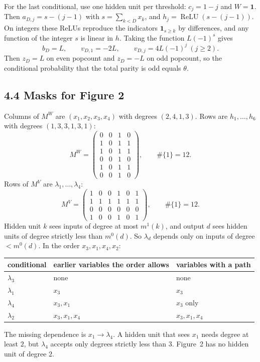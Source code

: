 \documentclass[11pt]{article}
\theoremstyle{remark}
\DeclareMathOperator{\ReLU}{ReLU}
\begin{document}
For the last conditional, use one hidden unit per threshold: \(c_j=1-j\) and \(W=\mathbf{1}\). Then \(a_{D,j}=s-(j-1)\) with \(s=\sum_{k<D}x_k\), and \(h_j=\ReLU(s-(j-1))\). On integers these ReLUs reproduce the indicators \(\mathbf{1}_{s\ge k}\) by differences, and any function of the integer \(s\) is linear in \(h\). Taking the function \(L(-1)^s\) gives
\[
b_D=L,\qquad v_{D,1}=-2L,\qquad v_{D,j}=4L(-1)^j\ (j\ge 2).
\]
Then \(z_D=L\) on even popcount and \(z_D=-L\) on odd popcount, so the conditional probability that the total parity is odd equals \(\theta\).

\subsection*{4.4 Masks for Figure 2}

Columns of \(M^W\) are \((x_1,x_2,x_3,x_4)\) with degrees \((2,4,1,3)\). Rows are \(h_1,\ldots,h_6\) with degrees \((1,3,3,1,3,1)\):
\[
M^W=\begin{pmatrix}
0&0&1&0\\
1&0&1&1\\
1&0&1&1\\
0&0&1&0\\
1&0&1&1\\
0&0&1&0
\end{pmatrix},
\qquad
\#\{1\}=12.
\]
Rows of \(M^V\) are \(\lambda_1,\ldots,\lambda_4\):
\[
M^V=\begin{pmatrix}
1&0&0&1&0&1\\
1&1&1&1&1&1\\
0&0&0&0&0&0\\
1&0&0&1&0&1
\end{pmatrix},
\qquad
\#\{1\}=12.
\]
Hidden unit \(k\) sees inputs of degree at most \(m^1(k)\), and output \(d\) sees hidden units of degree strictly less than \(m^0(d)\). So \(\lambda_d\) depends only on inputs of degree \(<m^0(d)\). In the order \(x_3,x_1,x_4,x_2\):
\begin{center}
\begin{tabular}{@{}lll@{}}
\toprule
conditional & earlier variables the order allows & variables with a path \\
\midrule
\(\lambda_3\) & none & none \\
\(\lambda_1\) & \(x_3\) & \(x_3\) \\
\(\lambda_4\) & \(x_3,x_1\) & \(x_3\) only \\
\(\lambda_2\) & \(x_3,x_1,x_4\) & \(x_3,x_1,x_4\) \\
\bottomrule
\end{tabular}
\end{center}
The missing dependence is \(x_1\to\lambda_4\). A hidden unit that sees \(x_1\) needs degree at least \(2\), but \(\lambda_4\) accepts only degrees strictly less than \(3\). Figure~2 has no hidden unit of degree \(2\).
\end{document}
